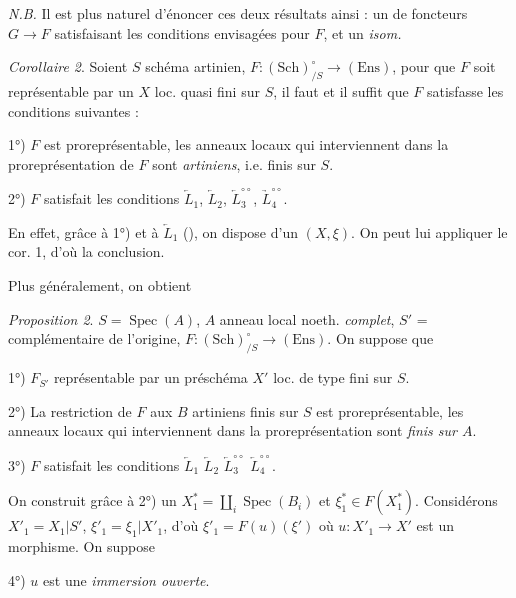 \documentclass[11pt,a4paper]{article}
\begin{document}
\emph{N.B.} Il est plus naturel d'énoncer ces deux résultats ainsi :
\ill{} \ill{} un  de foncteurs $G \to F$ satisfaisant les
conditions envisagées pour $F$, et \ill{} \ill{}  un
\emph{isom.}

\emph{Corollaire 2}. Soient $S$ schéma artinien,
$F : (\mathrm{Sch})^{\circ}_{/S} \to (\mathrm{Ens})$, pour que $F$ soit
représentable par un $X$ loc. quasi fini sur $S$, il faut et il suffit que
$F$ satisfasse les conditions suivantes :

1°) $F$ est proreprésentable, les anneaux locaux qui interviennent dans la
proreprésentation de $F$ sont \struck{\ill{}} \emph{artiniens}, i.e. finis
sur $S$.

2°) $F$ satisfait les conditions $\underleftarrow{L}_1$,
$\underleftarrow{L}_2$, $\underleftarrow{L}_3^{\circ\circ}$,
$\underrightarrow{L}_4^{\circ\circ}$.

En effet, grâce à 1°) et à $\underleftarrow{L}_1$ (\ill{}), on dispose d'un
$(X, \xi)$. On peut lui appliquer le cor. 1, d'où la conclusion.

 Plus généralement, on obtient


\emph{Proposition 2}. $S = \operatorname{Spec}(A)$, $A$ anneau local noeth.
\emph{complet}, $S'$ = complémentaire de l'origine, \struck{\ill{}}
$F : (\mathrm{Sch})^{\circ}_{/S} \to (\mathrm{Ens})$. On suppose que

1°) $F_{S'}$ représentable par un  préschéma $X'$ loc. de type
fini sur $S$.

2°) La restriction de $F$ aux $B$ artiniens finis sur $S$ est
proreprésentable, les anneaux locaux qui interviennent dans la
proreprésentation  sont \emph{finis sur $A$}.

3°) $F$ satisfait les conditions $\underleftarrow{L}_1$
$\underleftarrow{L}_2$ $\underleftarrow{L}_3^{\circ\circ}$
$\underleftarrow{L}_4^{\circ\circ}$.

On construit grâce à 2°) un
$X_1^{*} = \coprod_i \operatorname{Spec}(B_i)$ et
$\xi_1^{*} \in F(X_1^{*})$. Considérons $X'_1 = X_1 | S'$,
$\xi'_1 = \xi_1 | X'_1$, d'où $\xi'_1 = F(u)(\xi')$ où
$u : X'_1 \to X'$ est un morphisme. On suppose

4°) $u$ est une \emph{immersion ouverte}.
\end{document}
